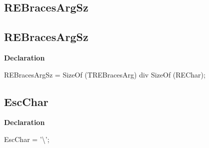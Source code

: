 \documentclass{report}
\newif\ifpdf
\begin{document}
\subsection*{\large{\textbf{REBracesArgSz}}\normalsize\hspace{1ex}\hrulefill}
\else
\subsection*{REBracesArgSz}
\fi
\label{RegExpr-REBracesArgSz}
\begin{list}{}{
\setlength{\itemindent}{0cm}
\setlength{\listparindent}{0cm}
\setlength{\leftmargin}{\evensidemargin}
\addtolength{\leftmargin}{\tmplength}
\settowidth{\labelsep}{X}
\addtolength{\leftmargin}{\labelsep}
\setlength{\labelwidth}{\tmplength}
}
\item[\textbf{Declaration}\hfill]
\ifpdf
\begin{flushleft}
\fi
\begin{ttfamily}
REBracesArgSz = SizeOf (TREBracesArg) div SizeOf (REChar);\end{ttfamily}

\ifpdf
\end{flushleft}
\fi

\end{list}
\ifpdf
\subsection*{\large{\textbf{EscChar}}\normalsize\hspace{1ex}\hrulefill}
\else
\subsection*{EscChar}
\fi
\label{RegExpr-EscChar}
\begin{list}{}{
\setlength{\itemindent}{0cm}
\setlength{\listparindent}{0cm}
\setlength{\leftmargin}{\evensidemargin}
\addtolength{\leftmargin}{\tmplength}
\settowidth{\labelsep}{X}
\addtolength{\leftmargin}{\labelsep}
\setlength{\labelwidth}{\tmplength}
}
\item[\textbf{Declaration}\hfill]
\ifpdf
\begin{flushleft}
\fi
\begin{ttfamily}
EscChar = '{\textbackslash}';\end{ttfamily}

\ifpdf
\end{flushleft}
\fi

\end{list}
\ifpdf
\end{document}
